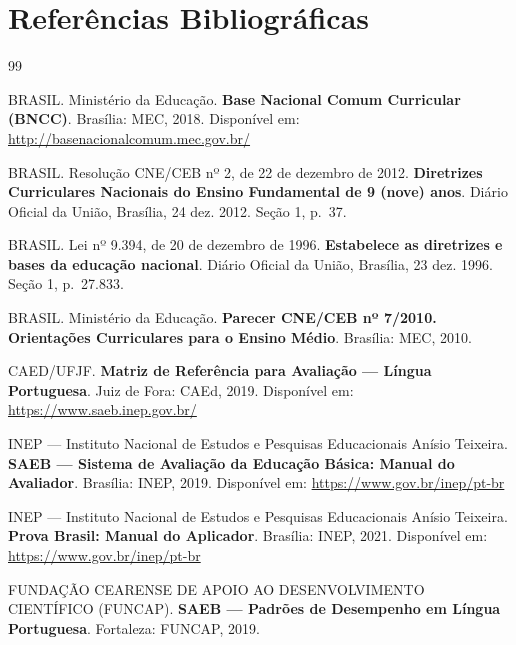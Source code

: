 
\chapter{Referências Bibliográficas}

\begin{thebibliography}{99}


BRASIL. Ministério da Educação. \textbf{Base Nacional Comum Curricular (BNCC)}.
Brasília: MEC, 2018. Disponível em: \url{http://basenacionalcomum.mec.gov.br/}

BRASIL. Resolução CNE/CEB nº 2, de 22 de dezembro de 2012.
\textbf{Diretrizes Curriculares Nacionais do Ensino Fundamental de 9 (nove) anos}.
Diário Oficial da União, Brasília, 24 dez. 2012. Seção 1, p.~37.

BRASIL. Lei nº 9.394, de 20 de dezembro de 1996.
\textbf{Estabelece as diretrizes e bases da educação nacional}.
Diário Oficial da União, Brasília, 23 dez. 1996. Seção 1, p.~27.833.

BRASIL. Ministério da Educação. \textbf{Parecer CNE/CEB nº 7/2010.
Orientações Curriculares para o Ensino Médio}. Brasília: MEC, 2010.


CAED/UFJF. \textbf{Matriz de Referência para Avaliação ---
Língua Portuguesa}. Juiz de Fora: CAEd, 2019. Disponível em:
\url{https://www.saeb.inep.gov.br/}

INEP — Instituto Nacional de Estudos e Pesquisas Educacionais Anísio Teixeira.
\textbf{SAEB — Sistema de Avaliação da Educação Básica: Manual do Avaliador}.
Brasília: INEP, 2019. Disponível em: \url{https://www.gov.br/inep/pt-br}

INEP — Instituto Nacional de Estudos e Pesquisas Educacionais Anísio Teixeira.
\textbf{Prova Brasil: Manual do Aplicador}. Brasília: INEP, 2021.
Disponível em: \url{https://www.gov.br/inep/pt-br}

FUNDAÇÃO CEARENSE DE APOIO AO DESENVOLVIMENTO CIENTÍFICO (FUNCAP).
\textbf{SAEB — Padrões de Desempenho em Língua Portuguesa}.
Fortaleza: FUNCAP, 2019.



\end{thebibliography}
